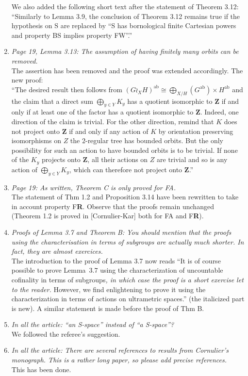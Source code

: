 \documentclass[english,a4paper]{article}
\DeclareMathOperator\ab{ab}
\newcommand*{\FA}{FA}
\newcommand*{\FR}{F\textbf{R}}
\newcommand*\Z{\mathbf{Z}}
\begin{document}
\begin{enumerate}
We also added the following short text after the statement of Theorem 3.12:\\
``Similarly to Lemma 3.9, the conclusion of Theorem 3.12 remains true if the hypothesis on S are replaced by “S has bornological finite Cartesian powers and property BS implies property FW”.''
%
\item\textit{Page 19, Lemma 3.13: The assumption of having finitely many orbits can be removed.}\\
The assertion has been removed and the proof was extended accordingly. The new proof:\\
``The desired result then follows from $(G\wr_XH)^{\ab}\cong \bigoplus_{X/H}(G^{\ab})\times H^{\ab}$ and the claim that a direct sum $\bigoplus_{y\in Y}K_y$ has a quotient isomorphic to $\Z$ if and only if at least one of the factor has a quotient isomorphic to $\Z$.
Indeed, one direction of the claim is trivial.
For the other direction, remind that $K$ does not project onto $\Z$ if and only if any action of $K$ by orientation preserving isomorphisms on $Z$ the $2$-regular tree has bounded orbits. But the only possibility for such an action to have bounded orbits is to be trivial.
If none of the $K_y$ projects onto $\Z$, all their actions on $Z$ are trivial and so is any action of $\bigoplus_{y\in Y}K_y$, which can therefore not project onto $\Z$.''
%
\item\textit{Page 19: As written, Theorem C is only proved for \FA.}\\
The statement of Thm 1.2 and Proposition 3.14 have been rewritten to take in account property \FR. Observe that the proofs remain unchanged (Theorem 1.2 is proved in [Cornulier-Kar] both for \FA{} and \FR).
%
\item\textit{Proofs of Lemma 3.7 and Theorem B: You should mention that the proofs using the characterisation in terms of subgroups are actually much shorter. In fact, they are almost exercices.}\\
The introduction to the proof of Lemma 3.7 now reads ``It is of course possible to prove Lemma~3.7 using the characterization of uncountable cofinality in terms of subgroups\emph{, in which case the proof is a short exercise let to the reader.} However, we find enlightening to prove it using the characterization in terms of actions on ultrametric spaces.'' (the italicized part is new).
A similar statement is made before the proof of Thm B.
%
\item\textit{In all the article: “an S-space” instead of “a S-space”?}\\
We followed the referee's suggestion.
%
\item\textit{In all the article: There are several references to results from Cornulier’s monograph. This is a rather long paper, so please add precise references.}\\
This has been done.








\end{enumerate}
\end{document}
